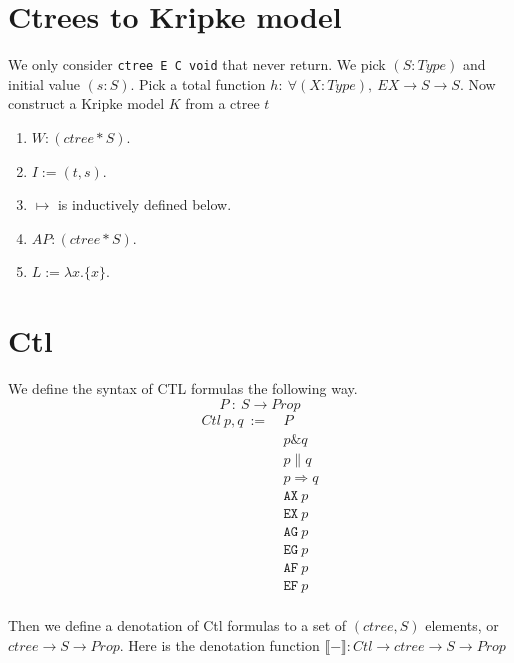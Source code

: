 \documentclass[10pt]{acmart}
\begin{document}
\section*{Ctrees to Kripke model}
We only consider \texttt{ctree E C void} that never return.
We pick $(S: Type)$ and initial value $(s: S)$. Pick a total function $h:\ \forall (X: Type),\ E X \to S \to S$.
Now construct a Kripke model $K$ from a ctree $t$ 
\begin{enumerate}
\item $W : (ctree * S)$.
\item $I := (t, s)$.
\item $\mapsto$ is inductively defined below.
\item $AP : (ctree * S)$.
\item $L := \lambda x. \{ x \} $.
\end{enumerate}
\vspace{1cm}
\begin{minipage}{0.3\textwidth}
\end{minipage}
\hspace{1cm}
\begin{minipage}{0.3\textwidth}
\end{minipage}

\newpage
\section*{Ctl}
We define the syntax of CTL formulas the following way.
$$ P\ :\ S \to Prop $$
\begin{align*}
  Ctl\ p, q\ := &\ P \\
  &\ p \& q \\
  &\ p \| q \\
  &\ p \Rightarrow q \\
  &\ \texttt{AX}\ p \\
  &\ \texttt{EX}\ p \\
  &\ \texttt{AG}\ p \\
  &\ \texttt{EG}\ p \\
  &\ \texttt{AF}\ p \\
  &\ \texttt{EF}\ p \\
\end{align*}

Then we define a denotation of Ctl formulas to a set of $(ctree, S)$ elements, or $ctree \to S \to Prop$. Here is the
denotation function $\llbracket - \rrbracket: Ctl \to ctree \to S \to Prop $
\end{document}
